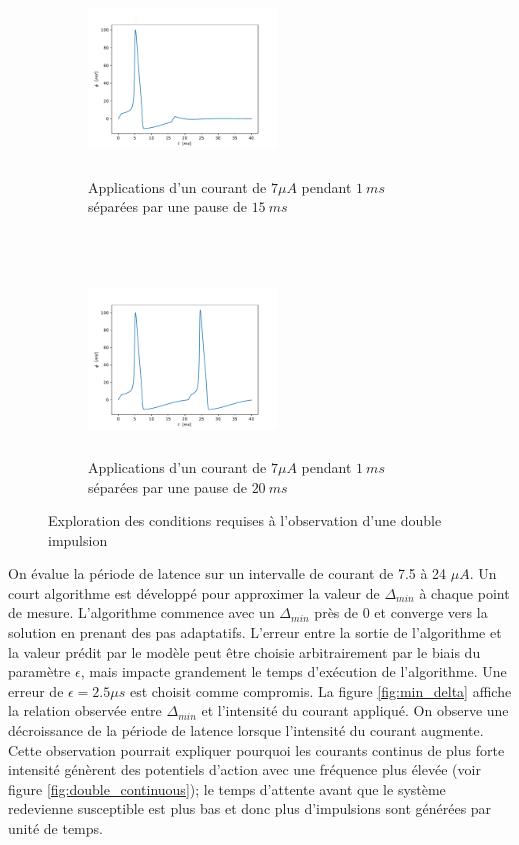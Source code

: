 \documentclass{article}
\begin{document}
\begin{figure}[H]
	\begin{subfigure}{0.5\linewidth}
		\includegraphics[width=5cm, height=5cm]{double_pulse_echec.pdf}
		\centering
		\caption{Applications d'un courant de $7 \mu A$ pendant $1\ ms$ séparées par une pause de $15\ ms$}
		\label{fig:double_echec}
	\end{subfigure}
	~
	\begin{subfigure}{0.5\linewidth}
		\includegraphics[width=5cm, height=5cm]{double_pulse_succes.pdf}
		\centering
		\caption{Applications d'un courant de $7 \mu A$ pendant $1\ ms$ séparées par une pause de $20\ ms$}
		\label{fig:double_succes}
	\end{subfigure}
	\caption{Exploration des conditions requises à l'observation d'une double impulsion}
	\label{fig:double_pulse}
\end{figure}

On évalue la période de latence sur un intervalle de courant de 7.5 à 24 $\mu A$. Un court algorithme  est développé \cite{github} pour approximer la valeur de $\Delta_{min}$ à chaque point de mesure. L'algorithme commence avec un $\Delta_{min}$ près de 0 et converge vers la solution en prenant des pas adaptatifs. L'erreur entre la sortie de l'algorithme et la valeur prédit par le modèle peut être choisie arbitrairement par le biais du paramètre $\epsilon$, mais impacte grandement le temps d'exécution de l'algorithme. Une erreur de $\epsilon = 2.5 \mu s$ est choisit comme compromis. La figure \ref{fig:min_delta} affiche la relation observée entre $\Delta_{min}$ et l'intensité du courant appliqué. On observe une décroissance de la période de latence lorsque l'intensité du courant augmente. Cette observation pourrait expliquer pourquoi les courants continus de plus forte intensité génèrent des potentiels d'action avec une fréquence plus élevée (voir figure \ref{fig:double_continuous}); le temps d'attente avant que le système redevienne susceptible est plus bas et donc plus d'impulsions sont générées par unité de temps. 
\end{document}

